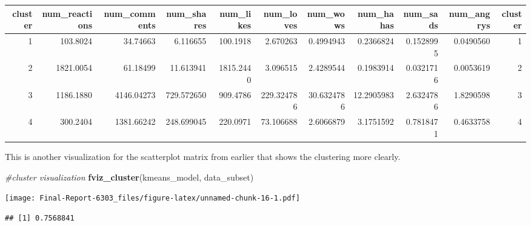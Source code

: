 \documentclass[
]{article}
\newenvironment{Shaded}{\begin{snugshade}}{\end{snugshade}}
\newcommand{\CommentTok}[1]{\textcolor[rgb]{0.56,0.35,0.01}{\textit{#1}}}
\newcommand{\FunctionTok}[1]{\textcolor[rgb]{0.13,0.29,0.53}{\textbf{#1}}}
\newcommand{\NormalTok}[1]{#1}
\newcommand{\OtherTok}[1]{\textcolor[rgb]{0.56,0.35,0.01}{#1}}
\newcommand{\SpecialCharTok}[1]{\textcolor[rgb]{0.81,0.36,0.00}{\textbf{#1}}}
\newcommand{\StringTok}[1]{\textcolor[rgb]{0.31,0.60,0.02}{#1}}
\begin{document}
\begin{table}
\centering
\begin{tabular}{rrrrrrrrrrr}
\toprule
cluster & num\_reactions & num\_comments & num\_shares & num\_likes & num\_loves & num\_wows & num\_hahas & num\_sads & num\_angrys & cluster\\
\midrule
1 & 103.8024 & 34.74663 & 6.116655 & 100.1918 & 2.670263 & 0.4994943 & 0.2366824 & 0.1528995 & 0.0490560 & 1\\
2 & 1821.0054 & 61.18499 & 11.613941 & 1815.2440 & 3.096515 & 2.4289544 & 0.1983914 & 0.0321716 & 0.0053619 & 2\\
3 & 1186.1880 & 4146.04273 & 729.572650 & 909.4786 & 229.324786 & 30.6324786 & 12.2905983 & 2.6324786 & 1.8290598 & 3\\
4 & 300.2404 & 1381.66242 & 248.699045 & 220.0971 & 73.106688 & 2.6066879 & 3.1751592 & 0.7818471 & 0.4633758 & 4\\
\bottomrule
\end{tabular}
\end{table}

This is another visualization for the scatterplot matrix from earlier
that shows the clustering more clearly.

\begin{Shaded}
\begin{Highlighting}[]
\CommentTok{\#cluster visualization}
\FunctionTok{fviz\_cluster}\NormalTok{(kmeans\_model, data\_subset)}
\end{Highlighting}
\end{Shaded}

\texttt{[image: Final-Report-6303\_files/figure-latex/unnamed-chunk-16-1.pdf]}

\begin{Shaded}
\end{Shaded}

\begin{verbatim}
## [1] 0.7568841
\end{verbatim}
\end{document}
